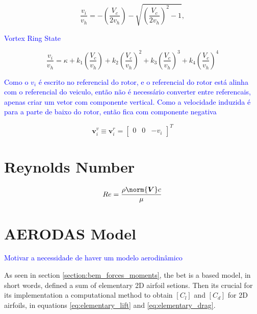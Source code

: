 \begin{equation}
    {\frac{v_{i}}{v_{h}}}=-\left({\frac{V_{c}}{2v_{h}}}\right)-{\sqrt{\left({\frac{V_{c}}{2v_{h}}}\right)^{2}-1}},
\end{equation}

\textcolor{blue}{Vortex Ring State}

\begin{equation}
    \frac{v_{i}}{v_{h}}=\kappa+k_{1}\left(\frac{V_{c}}{v_{h}}\right)+k_{2}\left(\frac{V_{c}}{v_{h}}\right)^{2}+k_{3}\left(\frac{V_{c}}{v_{h}}\right)^{3}+k_{4}\left(\frac{V_{c}}{v_{h}}\right)^{4}
\end{equation}

\textcolor{blue}{Como o $v_i$ é escrito no referencial do rotor, e o referencial do rotor está alinha com o referencial do veiculo, então não é necessário converter entre referencais, apenas criar um vetor com componente vertical. Como a velocidade induzida é para a parte de baixo do rotor, então fica com componente negativa}

\begin{equation}
   \boldsymbol{v}_{i}^v \equiv \boldsymbol{v}_{i}^r = \begin{bmatrix} 0 & 0 & -v_i \end{bmatrix}^T
\end{equation}


\section{Reynolds Number}

\begin{eqnarray}
    Re = \frac{\rho \norm{\boldsymbol{V}} c}{\mu}
    \label{eq:reynolds_number}
\end{eqnarray}

\section{AERODAS Model}
\label{section:aerodynamic_model}

\textcolor{blue}{Motivar a necessidade de haver um modelo aerodinâmico}

As seen in section \ref{section:bem_forces_moments}, the \gls{bet} is a based model, in short words, defined a sum of elementary 2D airfoil setions. Then its crucial for its implementation a computational method to obtain $\left[ C_l \right]$ and $\left[ C_d \right]$ for 2D airfoils, in equations \ref{eq:elementary_lift} and \ref{eq:elementary_drag}.

